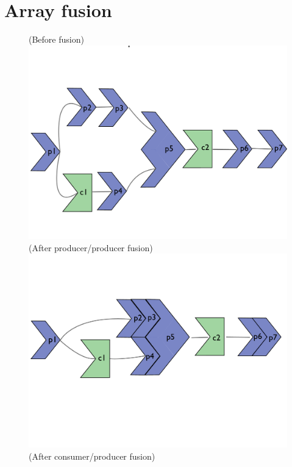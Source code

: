 \section{Array fusion} %
\label{sec:fusion}

\begin{figure}
\flushright
\small(Before fusion)\qquad\\
\centering
\includegraphics[scale=0.175]{figs/fusion1.pdf}
\flushright
\small(After producer/producer fusion)\qquad\\
\centering
\includegraphics[scale=0.175]{figs/fusion2.pdf}
\flushright
\small(After consumer/producer fusion)\qquad\\
\centering

\end{figure}
